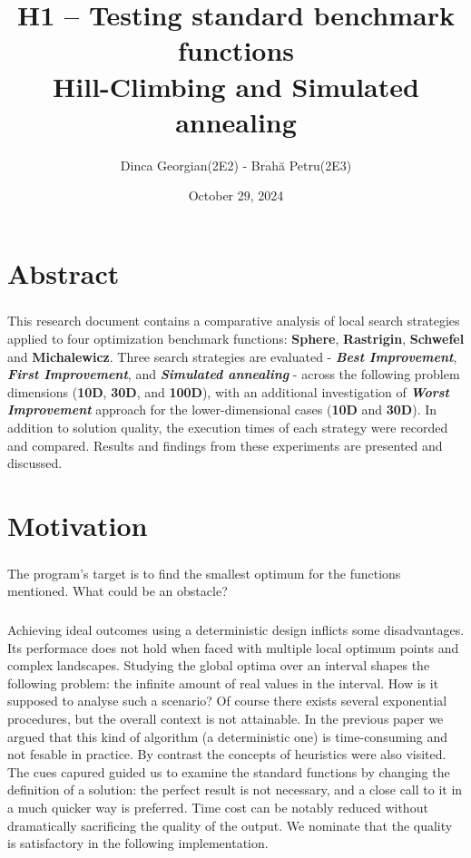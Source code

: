 \documentclass{article}
\title{H1 – Testing standard benchmark functions \\ Hill-Climbing and Simulated annealing}
\author{Dinca Georgian(2E2) - Brahă Petru(2E3)}
\date{October 29, 2024}
\begin{document}
\maketitle

\section{Abstract}

\subparagraph{}
This research document contains a comparative analysis of local search strategies applied to four optimization benchmark functions: \textbf{Sphere}, \textbf{Rastrigin}, \textbf{Schwefel} and \textbf{Michalewicz}. Three search strategies are evaluated - \textit{\textbf{Best Improvement}}, \textit{\textbf{First Improvement}}, and \textit{\textbf{Simulated annealing}} - across the following problem dimensions (\textbf{10D}, \textbf{30D}, and \textbf{100D}), with an additional investigation of \textit{\textbf{Worst Improvement}} approach for the lower-dimensional cases (\textbf{10D} and \textbf{30D}). In addition to solution quality, the execution times of each strategy were recorded and compared. Results and findings from these experiments are presented and discussed. 

\section{Motivation}

\subparagraph{}
The program's target is to find the smallest optimum for the functions mentioned. What could be an obstacle?

\subparagraph{}
Achieving ideal outcomes using a deterministic design inflicts some disadvantages. Its performace does not hold when faced with multiple local optimum points and complex landscapes. Studying the global optima over an interval shapes the following problem: the infinite amount of real values in the interval. How is it supposed to analyse such a scenario? Of course there exists several exponential procedures, but the overall context is not attainable. In the previous paper we argued that this kind of algorithm (a deterministic one) is time-consuming and not fesable in practice. By contrast the concepts of heuristics were also visited. The cues capured guided us to examine the standard functions by changing the definition of a solution: the perfect result is not necessary, and a close call to it in a much quicker way is preferred. Time cost can be notably reduced without dramatically sacrificing the quality of the output. We nominate that the quality is satisfactory in the following implementation. \\
\end{document}

